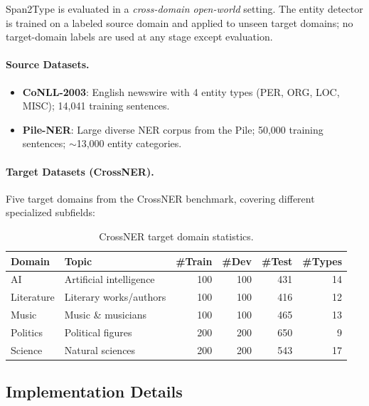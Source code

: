 \documentclass[11pt,a4paper]{article}
\begin{document}
Span2Type is evaluated in a \emph{cross-domain open-world} setting. The entity detector is trained on a labeled source domain and applied to unseen target domains; no target-domain labels are used at any stage except evaluation.

\paragraph{Source Datasets.}
\begin{itemize}[noitemsep]
  \item \textbf{CoNLL-2003}: English newswire with 4 entity types (PER, ORG, LOC, MISC); 14,041 training sentences.
  \item \textbf{Pile-NER}: Large diverse NER corpus from the Pile; 50,000 training sentences; ${\sim}$13,000 entity categories.
\end{itemize}

\paragraph{Target Datasets (CrossNER).}
Five target domains from the CrossNER benchmark, covering different specialized subfields:

\begin{table}[H]
\centering
\footnotesize
\caption{CrossNER target domain statistics.}
\begin{tabular}{l|l|r|r|r|r}
\toprule
\textbf{Domain} & \textbf{Topic} & \textbf{\#Train} & \textbf{\#Dev} & \textbf{\#Test} & \textbf{\#Types} \\
\midrule
AI         & Artificial intelligence & 100 & 100 & 431 & 14 \\
Literature & Literary works/authors  & 100 & 100 & 416 & 12 \\
Music      & Music \& musicians      & 100 & 100 & 465 & 13 \\
Politics   & Political figures       & 200 & 200 & 650 &  9 \\
Science    & Natural sciences        & 200 & 200 & 543 & 17 \\
\bottomrule
\end{tabular}
\end{table}

\subsection{Implementation Details}
\end{document}
